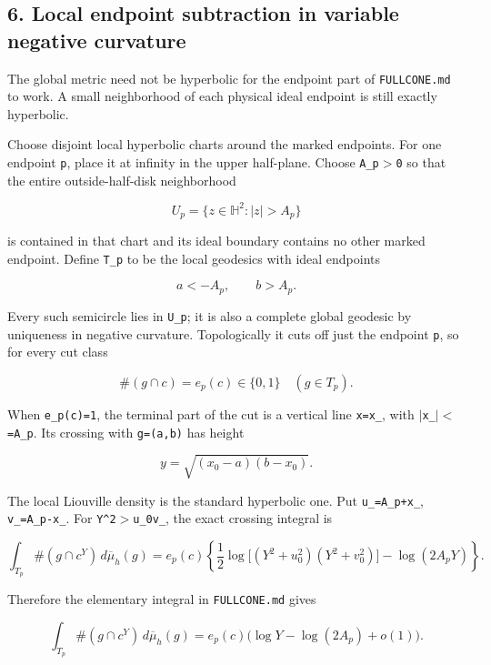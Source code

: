 \documentclass[11pt]{article}
\renewcommand{\textbar}{\ensuremath{|}}
\renewcommand{\textgreater}{\ensuremath{>}}
\renewcommand{\textless}{\ensuremath{<}}
\begin{document}
\subsection{6. Local endpoint subtraction in variable negative
curvature}\label{local-endpoint-subtraction-in-variable-negative-curvature}

The global metric need not be hyperbolic for the endpoint part of
\texttt{FULLCONE.md} to work. A small neighborhood of each physical
ideal endpoint is still exactly hyperbolic.

Choose disjoint local hyperbolic charts around the marked endpoints. For
one endpoint \texttt{p}, place it at infinity in the upper half-plane.
Choose \texttt{A\_\allowbreak p\textgreater{}0} so that the entire outside-half-disk
neighborhood

\[
U_p=\{z\in\mathbb H^2:|z|>A_p\}
\]

is contained in that chart and its ideal boundary contains no other
marked endpoint. Define \texttt{T\_\allowbreak p} to be the local geodesics with
ideal endpoints

\[
a<-A_p,\qquad b>A_p.
\]

Every such semicircle lies in \texttt{U\_\allowbreak p}; it is also a complete
global geodesic by uniqueness in negative curvature. Topologically it
cuts off just the endpoint \texttt{p}, so for every cut class

\[
\#(g\cap c)=e_p(c)\in\{0,1\}\quad(g\in T_p).
\tag{9}
\]

When \texttt{e\_\allowbreak p(c)=1}, the terminal part of the cut is a vertical line
\texttt{x=x\_}, with \texttt{\textbar{}x\_\textbar{}\textless{}=A\_\allowbreak p}.
Its crossing with \texttt{g=(a,b)} has height

\[
y=\sqrt{(x_0-a)(b-x_0)}.
\]

The local Liouville density is the standard hyperbolic one. Put
\texttt{u\_=A\_\allowbreak p+x\_}, \texttt{v\_=A\_\allowbreak p-x\_}. For
\texttt{Y\^{}2\textgreater{}u\_\allowbreak 0v\_}, the exact crossing integral is

\[
\int_{T_p}\#(g\cap c^Y)\,d\overline\mu_h(g)
=e_p(c)\left\{
\frac12\log\big[(Y^2+u_0^2)(Y^2+v_0^2)\big]
-\log(2A_pY)\right\}.
\]

Therefore the elementary integral in \texttt{FULLCONE.md} gives

\[
\int_{T_p}\#(g\cap c^Y)\,d\overline\mu_h(g)
=e_p(c)\big(\log Y-\log(2A_p)+o(1)\big).
\tag{10}
\]
\end{document}
